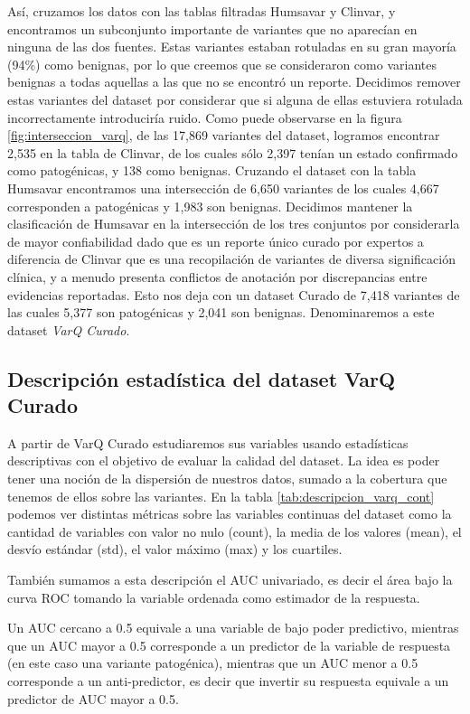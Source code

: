 Así, cruzamos los datos con las tablas filtradas Humsavar y Clinvar, y encontramos un subconjunto importante de variantes que no aparecían en ninguna de las dos fuentes. Estas variantes estaban rotuladas en su gran mayoría (94\%) como benignas, por lo que creemos que se consideraron como variantes benignas a todas aquellas a las que no se encontró un reporte. Decidimos remover estas variantes del dataset por considerar que si alguna de ellas estuviera rotulada incorrectamente introduciría ruido. Como puede observarse en la figura \ref{fig:interseccion_varq}, de las 17,869 variantes del dataset, logramos encontrar 2,535 en la tabla de Clinvar, de los cuales sólo 2,397 tenían un estado confirmado como patogénicas, y 138 como benignas. Cruzando el dataset con la tabla Humsavar encontramos una intersección de 6,650 variantes de los cuales 4,667 corresponden a patogénicas y 1,983 son benignas. Decidimos mantener la clasificación de Humsavar en la intersección de los tres conjuntos por considerarla de mayor confiabilidad dado que es un reporte único curado por expertos a diferencia de Clinvar que es una recopilación de variantes de diversa significación clínica, y a menudo presenta conflictos de anotación por discrepancias entre evidencias reportadas. Esto nos deja con un dataset Curado de 7,418 variantes de las cuales 5,377 son patogénicas y 2,041 son benignas. Denominaremos a este dataset \textit{VarQ Curado}. 


\subsection{Descripción estadística del dataset VarQ Curado}

A partir de VarQ Curado estudiaremos sus variables usando estadísticas descriptivas con el objetivo de evaluar la calidad del dataset. La idea es poder tener una noción de la dispersión de nuestros datos, sumado a la cobertura que tenemos de ellos sobre las variantes. En la tabla \ref{tab:descripcion_varq_cont} podemos ver distintas métricas sobre las variables continuas del dataset como la cantidad de variables con valor no nulo (count), la media de los valores (mean), el desvío estándar (std), el valor máximo (max) y los cuartiles. 

También sumamos a esta descripción el AUC univariado, es decir el área bajo la curva ROC tomando la variable ordenada como estimador de la respuesta.   

Un AUC cercano a 0.5 equivale a una variable de bajo poder predictivo, mientras que un AUC mayor a 0.5 corresponde a un predictor de la variable de respuesta (en este caso una variante patogénica), mientras que un AUC menor a 0.5 corresponde a un anti-predictor, es decir que invertir su respuesta equivale a un predictor de AUC mayor a 0.5.


